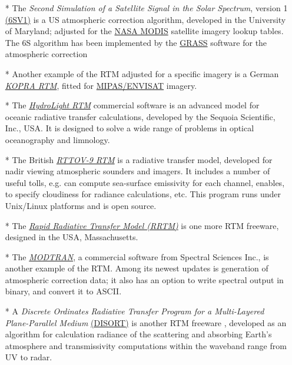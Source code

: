 \documentclass[10pt, a4paper]{article}
\begin{document}
	\begin{itemize}
		\item [*] The \textit{Second Simulation of a Satellite Signal in the Solar Spectrum}, version 1 \href{http://6s.ltdri.org/}{(6SV1)} is a US atmospheric correction algorithm, developed in the University of Maryland; adjusted for the \href{http://modis.gsfc.nasa.gov/}{NASA MODIS} satellite imagery lookup tables. The 6S algorithm has been implemented by the \href{http://grass.osgeo.org/grass64/manuals/html64_user/i.atcorr.html}{GRASS} software for the atmospheric correction 										 
		\item [*] Another example of the RTM adjusted for a specific imagery is a German \href{http://www.imk-asf.kit.edu/english/312.php}{\textit{KOPRA RTM}}, fitted for \href{http://envisat.esa.int/instruments/meris/}{MIPAS/ENVISAT} imagery.
		\item [*]  The \href{http://www.sequoiasci.com/products/Hydrolight.aspx}{\textit{HydroLight RTM}} commercial software is an advanced model for oceanic radiative transfer calculations, developed by the Sequoia Scientific, Inc., USA. It is designed to solve a wide range of problems in optical oceanography and limnology.   
		\item [*] The British \href{http://research.metoffice.gov.uk/research/interproj/nwpsaf/rtm/}{\textit{RTTOV-9 RTM}} is a radiative transfer model, developed for nadir viewing atmospheric sounders and imagers. It includes a number of useful tolls, e.g. can compute sea-surface emissivity for each channel, enables, to specify cloudiness for radiance calculations, etc.  This program runs under Unix/Linux platforms and is open source. 
		\item [*] The \href{http://rtweb.aer.com/}{\textit{Rapid Radiative Transfer Model (RRTM)}} is one more RTM freeware, designed in the USA, Massachusetts. 
		\item [*] The \href{http://www.modtran.org/}{\textit{MODTRAN}}, a commercial software from Spectral Sciences Inc., is another example of the RTM. Among its newest updates is generation of atmospheric correction data; it also has an option to write spectral output in binary, and convert it to ASCII.
		\item [*] A \textit{Discrete Ordinates Radiative Transfer Program for a Multi-Layered Plane-Parallel Medium} \href{ftp://climate1.gsfc.nasa.gov/wiscombe/Multiple_Scatt/DISORT1.2/}{(DISORT)}  is another RTM freeware , developed as an algorithm for calculation radiance of the scattering and absorbing Earth's atmosphere and transmissivity computations within the waveband range from UV to radar.  

\end{itemize}
\end{document}
